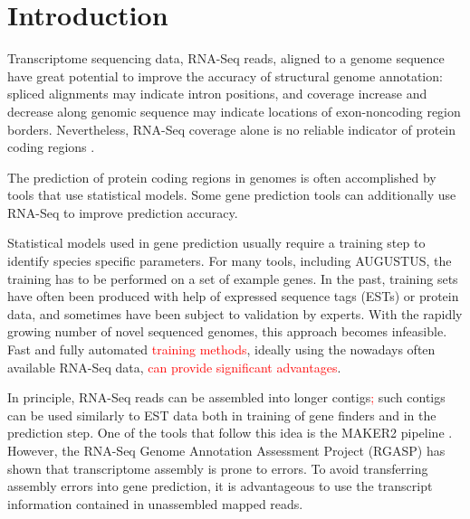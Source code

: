 \documentclass[a4paper,10pt]{article}
\begin{document}
\section{Introduction}

Transcriptome sequencing data, RNA-Seq reads, aligned to a genome sequence have great potential to improve the accuracy of structural genome annotation: spliced alignments may indicate intron positions, and coverage increase and decrease along genomic sequence may indicate locations of exon-noncoding region borders. Nevertheless, RNA-Seq coverage alone is no reliable indicator of protein coding regions \citep{InsectOpinion2015}. 

The prediction of protein coding regions in genomes is often accomplished by tools that use statistical models. Some gene prediction tools can additionally use RNA-Seq 
 to improve prediction accuracy.

Statistical models used in gene prediction usually require a training  step to identify species specific parameters. For many tools, including AUGUSTUS, the training has to be performed on a set of example genes. In the past, training sets have often been produced with help of expressed sequence tags (ESTs) or protein data, and sometimes have been subject to validation by experts. With the rapidly growing number of novel sequenced genomes, this approach becomes infeasible. Fast and fully automated \textcolor{red}{training methods}, ideally using the nowadays often available RNA-Seq data, \textcolor{red}{can provide significant advantages}.

In principle, RNA-Seq reads can be assembled into longer contigs\textcolor{red}{;} such contigs can be used similarly to EST data both in training of gene finders and in the prediction step. One of the tools that follow this idea is the MAKER2 pipeline \citep{MAKER2}. However, the RNA-Seq Genome Annotation Assessment Project (RGASP) \citep{RGASP} has shown that transcriptome assembly is prone to errors. To avoid transferring assembly errors into gene prediction, it is advantageous to use the transcript information contained in unassembled mapped reads.
\end{document}
